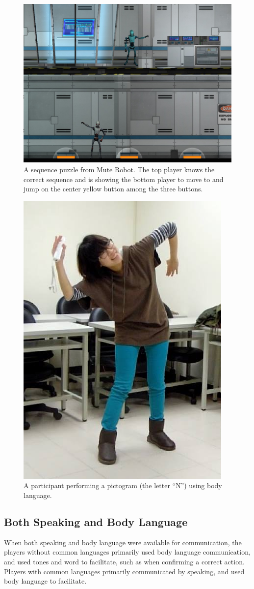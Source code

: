 \begin{figure}[!t]
\centering
\includegraphics[width=0.7\columnwidth]{Figures/US_F2.jpg}
\caption{A sequence puzzle from Mute Robot. The top player knows the correct sequence and is showing the bottom player to move to and jump on the center yellow button among the three buttons.}
\label{fig:US_F2}
\end{figure}

\begin{figure}[!t]
\centering
\includegraphics[width=0.4\columnwidth]{Figures/US_F3.jpg}
\caption{A participant performing a pictogram (the letter ``N'') using body language.}
\label{fig:US_F3}
\end{figure}


\subsection{Both Speaking and Body Language}
When both speaking and body language were available for communication, the players without common languages primarily used body language communication, and used tones and word to facilitate, such as when confirming a correct action. Players with common languages primarily communicated by speaking, and used body language to facilitate. 



